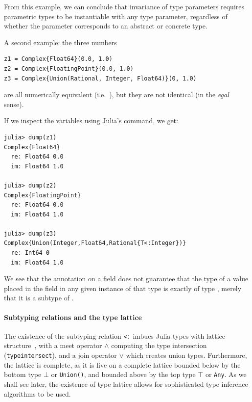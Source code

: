 \documentclass[pldi]{sigplanconf-pldi15}
\begin{document}
From this example, we can conclude that invariance of type parameters requires
parametric types to be instantiable with any type parameter, regardless of
whether the parameter corresponds to an abstract or concrete type.


A second example: the three  numbers

\begin{verbatim}
z1 = Complex{Float64}(0.0, 1.0)
z2 = Complex{FloatingPoint}(0.0, 1.0)
z3 = Complex{Union(Rational, Integer, Float64)}(0, 1.0)
\end{verbatim}

are all numerically equivalent (i.e.\ ), but they are not
identical (in the \textit{egal} sense).

If we inspect the variables using Julia's  command, we get:

\begin{verbatim}
julia> dump(z1)
Complex{Float64} 
  re: Float64 0.0
  im: Float64 1.0

julia> dump(z2)
Complex{FloatingPoint} 
  re: Float64 0.0
  im: Float64 1.0

julia> dump(z3)
Complex{Union(Integer,Float64,Rational{T<:Integer})} 
  re: Int64 0
  im: Float64 1.0

\end{verbatim}

We see that the  annotation on a field does not guarantee that the
type of a value placed in the field in any given instance of that type is
exactly of type , merely that it is a subtype of .


\paragraph{Subtyping relations and the type lattice}

The existence of the subtyping relation \verb|<:| imbues Julia types with
lattice structure~\cite{Scott1976}, with a meet operator $\wedge$ computing the
type intersection (\verb|typeintersect|), and a join operator $\vee$ which
creates union types. Furthermore, the lattice is complete, as it is live on a
complete lattice bounded below by the bottom type $\bot$ or
\verb|Union()|, and bounded above by the top type $\top$ or \verb|Any|. As we
shall see later, the existence of type lattice allows for sophisticated type
inference algorithms to be used.  
\end{document}
